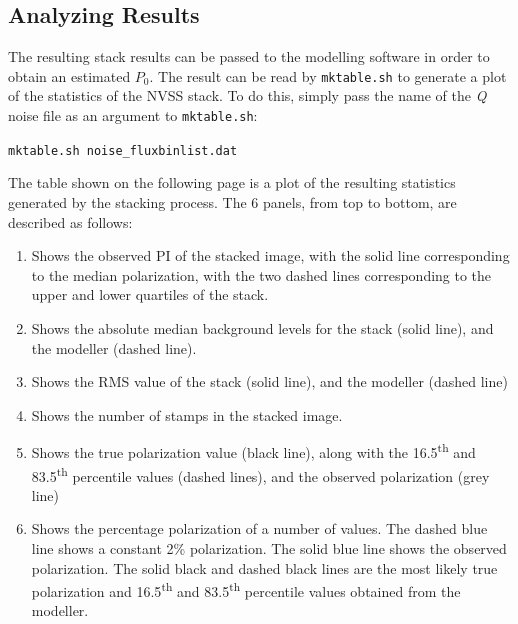 \documentclass{article}
\begin{document}
\subsection{Analyzing Results}
The resulting stack results can be passed to the modelling software in order to obtain an estimated $P_0$.  The result can be read by \verb!mktable.sh! to generate a plot of the statistics of the NVSS stack.  To do this, simply pass the 
name of the \emph{Q} noise file as an argument to \verb!mktable.sh!:
\begin{center}
\verb!mktable.sh noise_fluxbinlist.dat!
\end{center}
The table shown on the following page is a plot of the resulting statistics 
generated by the stacking process.  The 6 panels, from top to bottom, are 
described as follows:
\begin{enumerate}
	\item Shows the observed PI of the stacked image, with the 
	solid line corresponding to the median polarization, with the two 
	dashed lines corresponding to the upper and lower quartiles of the 
	stack.
	\item Shows the absolute median background levels for the stack (solid 
	line), and the modeller (dashed line).
	\item Shows the RMS value of the stack (solid line), and the modeller 
	(dashed line)
	\item Shows the number of stamps in the stacked image.
	\item Shows the true polarization value (black line), along with the
	16.5\textsuperscript{th} and 83.5\textsuperscript{th} percentile values 
	(dashed lines), and the observed polarization (grey line)
	\item Shows the percentage polarization of a number of values.  The 
	dashed blue line shows a constant 2\% polarization.  The solid blue line
	shows the observed polarization.  The solid black and dashed black lines
	are the most likely true polarization and 16.5\textsuperscript{th} and 
	83.5\textsuperscript{th} percentile values obtained from the modeller.
\end{enumerate}
\end{document}
